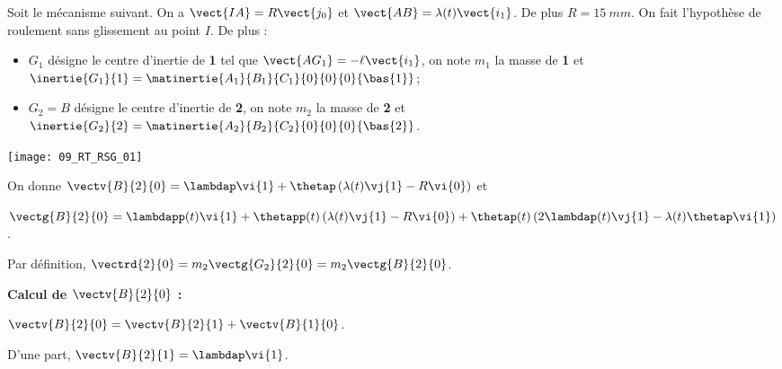 \normalfalse \difficiletrue \tdifficilefalse
\correctiontrue


\setcounter{question}{0}
\ifcorrection
\else
{}
\fi

\ifprof
\else
Soit le mécanisme suivant. On a $\vect{IA}=R\vect{j_0}$ et $\vect{AB}=\lambda(t)\vect{i_1}$. De plus $R=\SI{15}{mm}$.
On fait l'hypothèse de roulement sans glissement au point $I$. De plus :
\begin{itemize}
\item $G_1$ désigne le centre d'inertie de \textbf{1} tel que $\vect{AG_1}=-\ell\vect{i_1}$, on note $m_1$ la masse de \textbf{1} et $\inertie{G_1}{1}=\matinertie{A_1}{B_1}{C_1}{0}{0}{0}{\bas{1}}$; 
\item $G_2=B$ désigne le centre d'inertie de \textbf{2}, on note $m_2$ la masse de \textbf{2} et $\inertie{G_2}{2}=\matinertie{A_2}{B_2}{C_2}{0}{0}{0}{\bas{2}}$.
\end{itemize}
\begin{center}
\texttt{[image: 09\_RT\_RSG\_01]}
\end{center}

On donne  $\vectv{B}{2}{0} = \lambdap\vi{1} + \thetap\left(\lambda(t)\vj{1}-R\vi{0} \right)$
et

$\vectg{B}{2}{0}  = \lambdapp(t)\vi{1} %
+ \thetapp(t)\left(\lambda(t)\vj{1}-R\vi{0} \right)
+ \thetap(t)\left(2\lambdap(t)\vj{1}-\lambda(t)\thetap\vi{1} \right)
$.


\fi



\ifprof

Par définition, $\vectrd{2}{0} =  m_2 \vectg{G_2}{2}{0}=  m_2 \vectg{B}{2}{0}$.

\vspace{.5cm}

\textbf{Calcul de $ \vectv{B}{2}{0}$ :}

$\vectv{B}{2}{0}=\vectv{B}{2}{1}+\vectv{B}{1}{0}$.

D'une part,  $\vectv{B}{2}{1}=\lambdap\vi{1}$.

